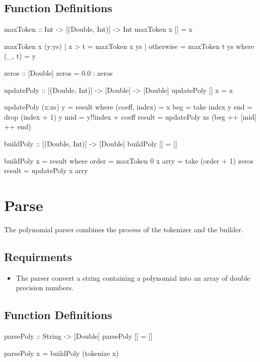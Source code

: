 \subsection{Function Definitions}
\begin{code}
maxToken :: Int -> [(Double, Int)] -> Int
maxToken x [] = x

maxToken x (y:ys)
  | x > t = maxToken x ys
  | otherwise = maxToken t ys
  where
    (_, t) = y  

zeros :: [Double]
zeros = 0.0 : zeros

updatePoly :: [(Double, Int)] -> [Double] -> [Double]
updatePoly [] x = x

updatePoly (x:xs) y = result
  where
    (coeff, index) = x
    beg = take index y
    end = drop (index + 1) y
    mid = y!!index + coeff
    result = updatePoly xs (beg ++ [mid] ++ end)

buildPoly :: [(Double, Int)] -> [Double]
buildPoly [] = []

buildPoly x = result
  where
    order = maxToken 0 x
    arry = take (order + 1) zeros
    result = updatePoly x arry
\end{code}

\section{Parse}
The polynomial parser combines the process of the tokenizer and the builder.
\subsection{Requirments}
\begin{itemize}
\item The parser  convert a string containing a polynomial into an array of double precision numbers.
\end{itemize}

\subsection{Function Definitions}
\begin{code}
parsePoly :: String -> [Double]
parsePoly [] = []

parsePoly x = buildPoly (tokenize x)
\end{code}
